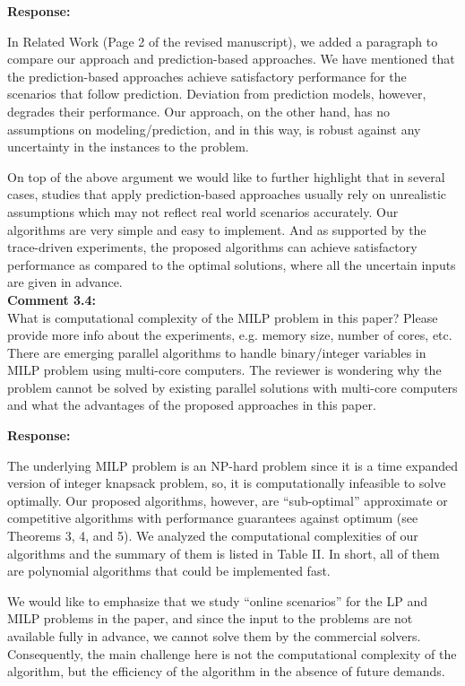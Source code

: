 \documentclass[11pt]{article}
\begin{document}
\vspace{5mm}
\noindent\textbf{Response:}

In Related Work (Page 2 of the revised manuscript), we added a paragraph to compare our approach and prediction-based approaches. We have mentioned that the prediction-based approaches achieve satisfactory performance for the scenarios that follow prediction. Deviation from prediction models, however, degrades their performance. Our approach, on the other hand, has no assumptions on modeling/prediction, and in this way, is robust against any uncertainty in the instances to the problem.

On top of the above argument we would like to further highlight that in several cases, studies that apply prediction-based approaches usually rely on unrealistic assumptions which may not reflect real world scenarios accurately. 
Our algorithms are very simple and easy to implement. And as supported by the trace-driven experiments, the proposed algorithms can achieve satisfactory performance as compared to the optimal solutions, where all the uncertain inputs are given in advance. 
\\

\vspace{5mm}
{
{\color{blue}\noindent\textbf{Comment 3.4:}\\
What is computational complexity of the MILP problem in this paper? Please provide more info about the experiments, e.g. memory size, number of cores, etc. There are emerging parallel algorithms to handle binary/integer variables in MILP problem using multi-core computers. The reviewer is wondering why the problem cannot be solved by existing parallel solutions with multi-core computers and what the advantages of the proposed approaches in this paper.
}}

\vspace{5mm}
\noindent\textbf{Response:}

The underlying MILP problem is an NP-hard problem since it is a time expanded version of integer knapsack problem, so, it is computationally infeasible to solve optimally. 
Our proposed algorithms, however, are ``sub-optimal'' approximate or competitive algorithms with performance guarantees against optimum (see Theorems 3, 4, and 5). We analyzed the computational complexities of our algorithms and the summary of them is listed in Table II. In short, all of them are polynomial algorithms that could be implemented fast. 

 
We would like to emphasize that we study ``online scenarios'' for the LP and MILP problems in the paper, and since the input to the problems are not available fully in advance, we cannot solve them by the commercial solvers. Consequently, the main challenge here is not the computational complexity of the algorithm, but the efficiency of the algorithm in the absence of future demands.
\end{document}
